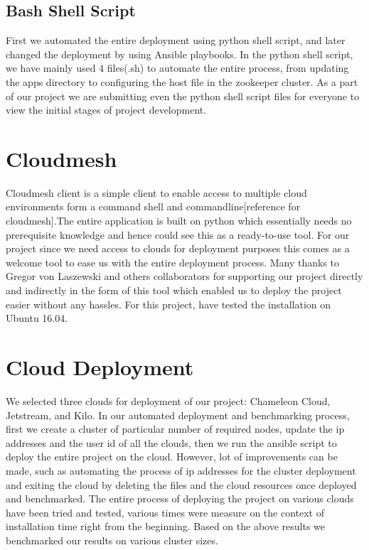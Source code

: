 \documentclass[9pt,twocolumn,twoside]{../../styles/osajnl}
\begin{document}
\subsection{Bash Shell Script}

First we automated the entire deployment using python shell script,
and later changed the deployment by using Ansible playbooks. In the
python shell script, we have mainly used 4 files(.sh) to automate the
entire process, from updating the apps directory to configuring the
host file in the zookeeper cluster. As a part of our project we are
submitting even the python shell script files for everyone to view the
initial stages of project development.
  
\section{Cloudmesh}
Cloudmesh client is a simple client to enable access to multiple cloud
environments form a command shell and commandline[reference for
  cloudmesh].The entire application is built on python which
essentially needs no prerequisite knowledge and hence could see this
as a ready-to-use tool. For our project since we need access to clouds
for deployment purposes this comes as a welcome tool to ease us with
the entire deployment process. Many thanks to Gregor von Laszewski and
others collaborators for supporting our project directly and
indirectly in the form of this tool which enabled us to deploy the
project easier without any hassles. For this project, have tested the
installation on Ubuntu 16.04.

\section{Cloud Deployment}


We selected three clouds for deployment of our project: Chameleon Cloud, Jetstream, and Kilo. In our automated deployment and benchmarking process,
first we create a cluster of particular number of required nodes,
update the ip addresses and the user id of all the clouds, then we run
the ansible script to deploy the entire project on the cloud. However,
lot of improvements can be made, such as automating the process of ip
addresses for the cluster deployment and exiting the cloud by deleting
the files and the cloud resources once deployed and benchmarked. The
entire process of deploying the project on various clouds have been
tried and tested, various times were measure on the context of
installation time right from the beginning. Based on the above results
we benchmarked our results on various cluster sizes.
\end{document}
